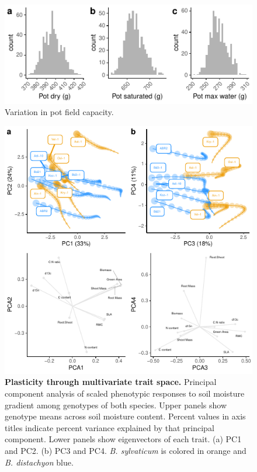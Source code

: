 \documentclass[jou,floatsintext]{apa6}
\begin{document}
\begin{figure}[!h]
\includegraphics[width=\textwidth]{../Figures/pots} \caption{Variation in pot field capacity.}\label{fig:pots}
\end{figure}



\begin{figure}[!h]
\includegraphics[width=\textwidth]{../Figures/pca_byspecies} \caption{\textbf{Plasticity through multivariate trait space.} Principal component analysis of scaled phenotypic responses to soil moisture gradient among genotypes of both species. Upper panels show genotype means across soil moisture content. Percent values in axis titles indicate percent variance explained by that principal component. Lower panels show eigenvectors of each trait. (a) PC1 and PC2. (b) PC3 and PC4. \emph{B. sylvaticum} is colored in orange and \emph{B. distachyon} blue.}\label{fig:pca}
\end{figure}
\end{document}
